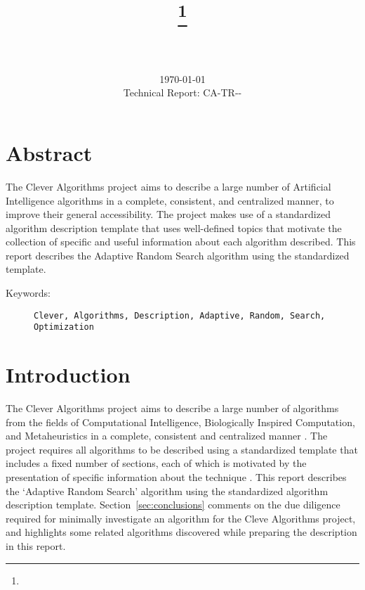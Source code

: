 \documentclass[a4paper, 11pt]{article}
\title{{\myreporttitle}\footnote{\myreportlicense}}
\author{\myreportauthor\\{\myreportemail}\\\small\myreportproject}
\date{\today\\{\small{Technical Report: CA-TR-{\myreportdate}-\myreportversion}}}
\begin{document}
\maketitle

\section*{Abstract} 
The Clever Algorithms project aims to describe a large number of Artificial Intelligence algorithms in a complete, consistent, and centralized manner, to improve their general accessibility. 
The project makes use of a standardized algorithm description template that uses well-defined topics that motivate the collection of specific and useful information about each algorithm described.
This report describes the Adaptive Random Search algorithm using the standardized template.

\begin{description}
	\item[Keywords:] {\small\texttt{Clever, Algorithms, Description, Adaptive, Random, Search, Optimization}}
\end{description} 

\section{Introduction} 
\label{sec:intro}
The Clever Algorithms project aims to describe a large number of algorithms from the fields of Computational Intelligence, Biologically Inspired Computation, and Metaheuristics in a complete, consistent and centralized manner \cite{Brownlee2010}.
The project requires all algorithms to be described using a standardized template that includes a fixed number of sections, each of which is motivated by the presentation of specific information about the technique \cite{Brownlee2010a}.
This report describes the `Adaptive Random Search' algorithm using the standardized algorithm description template. 
Section~\ref{sec:conclusions} comments on the due diligence required for minimally investigate an algorithm for the Cleve Algorithms project, and highlights some related algorithms discovered while preparing the description in this report.

\end{document}
